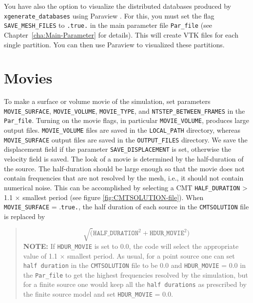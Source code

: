 You have also the option to visualize the distributed databases produced
by \texttt{xgenerate\_databases} using Paraview .
For this, you must set the flag \texttt{SAVE\_MESH\_FILES} to \texttt{.true.}
in the main parameter file \texttt{Par\_file} (see Chapter~\ref{cha:Main-Parameter}
for details). This will create VTK files for each single partition.
You can then use Paraview 
to visualized these partitions.


\section{Movies}\label{sec:Movies}

To make a surface or volume movie of the simulation, set parameters
\texttt{MOVIE\_SURFACE}, \texttt{MOVIE\_VOLUME}, \texttt{MOVIE\_TYPE},
and \texttt{NTSTEP\_BETWEEN\_FRAMES} in the \texttt{Par\_file}. Turning
on the movie flags, in particular \texttt{MOVIE\_VOLUME}, produces
large output files. \texttt{MOVIE\_VOLUME} files are saved in the
\texttt{LOCAL\_PATH} directory, whereas \texttt{MOVIE\_SURFACE} output
files are saved in the \texttt{OUTPUT\_FILES} directory. We save the
displacement field if the parameter \texttt{SAVE\_DISPLACEMENT} is
set, otherwise the velocity field is saved. The look of a movie is
determined by the half-duration of the source. The half-duration should
be large enough so that the movie does not contain frequencies that
are not resolved by the mesh, i.e., it should not contain numerical
noise. This can be accomplished by selecting a CMT \texttt{HALF\_DURATION}
> 1.1 $\times$ smallest period (see figure \ref{fig:CMTSOLUTION-file}).
When \texttt{MOVIE\_SURFACE} = .\texttt{true.}, the half duration
of each source in the \texttt{CMTSOLUTION} file is replaced by
\begin{quote}
\[
\sqrt{(}\mathrm{\mathtt{HALF\_DURATIO}\mathtt{N}^{2}}+\mathrm{\mathtt{HDUR\_MOVI}\mathtt{E}^{2}})
\]
 \textbf{NOTE:} If \texttt{HDUR\_MOVIE} is set to 0.0, the code will
select the appropriate value of 1.1 $\times$ smallest period. As
usual, for a point source one can set \texttt{half duration} in the
\texttt{CMTSOLUTION} file to be 0.0 and \texttt{HDUR\_MOVIE} = 0.0
in the \texttt{Par\_file} to get the highest frequencies resolved
by the simulation, but for a finite source one would keep all the
\texttt{half durations} as prescribed by the finite source model and
set \texttt{HDUR\_MOVIE} = 0.0.
\end{quote}


